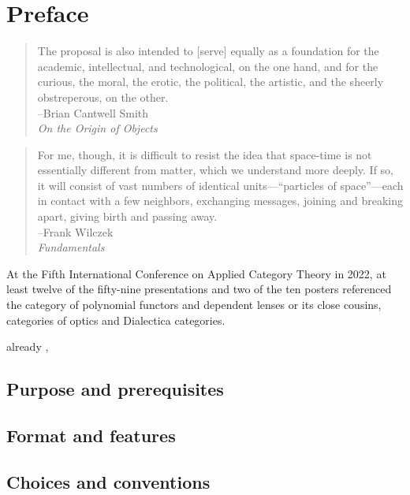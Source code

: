\documentclass[Book-Poly]{subfiles}
\begin{document}
\chapter*{Preface}\label{chapter.0}

\begin{quote}
	The proposal is also intended to [serve] equally as a foundation for the academic, intellectual, and technological, on the one hand, and for the curious, the moral, the erotic, the political, the artistic, and the sheerly obstreperous, on the other.\\
\mbox{}\hfill --Brian Cantwell Smith\\
\mbox{}\hfill \emph{On the Origin of Objects}
\end{quote}

\begin{quote}
For me, though, it is difficult to resist the idea that space-time is not essentially different from matter, which we understand more deeply. If so, it will consist of vast numbers of identical units---``particles of space''---each in contact with a few neighbors, exchanging messages, joining and breaking apart, giving birth and passing away.\\
\mbox{}\hfill --Frank Wilczek\\
\mbox{}\hfill \emph{Fundamentals}
\end{quote}

At the Fifth International Conference on Applied Category Theory in 2022, at least twelve of the fifty-nine presentations and two of the ten posters referenced the category of polynomial functors and dependent lenses or its close cousins, categories of optics and Dialectica categories.



already , 

\section*{Purpose and prerequisites}

\section*{Format and features}

\section*{Choices and conventions}
\end{document}
